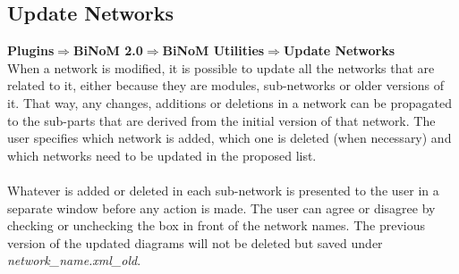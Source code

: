 \subsection{Update Networks}
\textbf{Plugins$\Rightarrow$BiNoM 2.0$\Rightarrow$BiNoM Utilities$\Rightarrow$Update Networks}\\
When a network is modified, it is possible to update all the networks that are related to it, either because they are modules, sub-networks or older versions of it. That way, any changes, additions or deletions in a network can be propagated to the sub-parts that are derived from the initial version of that network. The user specifies which network is added, which one is deleted (when necessary) and which networks need to be updated in the proposed list.\\\\
Whatever is added or deleted in each sub-network is presented to the user in a separate window before any action is made. The user can agree or disagree by checking or unchecking the box in front of the network names. The previous version of the updated diagrams will not be deleted but saved under \textit{network\_name.xml\_old}. 

